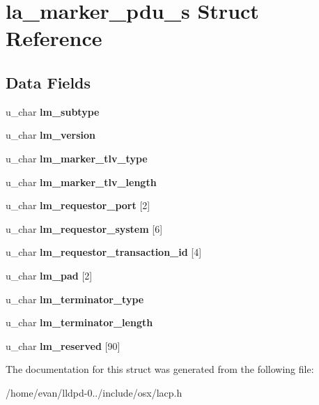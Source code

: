 \section{la\-\_\-marker\-\_\-pdu\-\_\-s \-Struct \-Reference}
\label{structla__marker__pdu__s}
\subsection*{\-Data \-Fields}
\begin{DoxyCompactItemize}
\item 
u\-\_\-char {\bfseries lm\-\_\-subtype}\label{structla__marker__pdu__s_aa5a9c3a8edf37f5c0cc5b5baed18b2ce}

\item 
u\-\_\-char {\bfseries lm\-\_\-version}\label{structla__marker__pdu__s_ae888b016721821cbb34fe34c0d203d86}

\item 
u\-\_\-char {\bfseries lm\-\_\-marker\-\_\-tlv\-\_\-type}\label{structla__marker__pdu__s_af33c94f2590be4493f1e572c605beeb7}

\item 
u\-\_\-char {\bfseries lm\-\_\-marker\-\_\-tlv\-\_\-length}\label{structla__marker__pdu__s_ad3bf3f23d14d859f72741f315e442b17}

\item 
u\-\_\-char {\bfseries lm\-\_\-requestor\-\_\-port} [2]\label{structla__marker__pdu__s_adbef70055c70a5179dc0ee6394f75e5f}

\item 
u\-\_\-char {\bfseries lm\-\_\-requestor\-\_\-system} [6]\label{structla__marker__pdu__s_afcc98f1122bd6fdce54c5acac9652402}

\item 
u\-\_\-char {\bfseries lm\-\_\-requestor\-\_\-transaction\-\_\-id} [4]\label{structla__marker__pdu__s_a30538d098282488e418de70c0ff499c5}

\item 
u\-\_\-char {\bfseries lm\-\_\-pad} [2]\label{structla__marker__pdu__s_a84c505df5e8a60709a34643fa53ce9fe}

\item 
u\-\_\-char {\bfseries lm\-\_\-terminator\-\_\-type}\label{structla__marker__pdu__s_a68be75756c8b4845e5ac0cbffe408951}

\item 
u\-\_\-char {\bfseries lm\-\_\-terminator\-\_\-length}\label{structla__marker__pdu__s_a8a1b58f657169d86a039a8131635040b}

\item 
u\-\_\-char {\bfseries lm\-\_\-reserved} [90]\label{structla__marker__pdu__s_a7accdb47fcff6d86045a4e0bf887935f}

\end{DoxyCompactItemize}


\-The documentation for this struct was generated from the following file\-:\begin{DoxyCompactItemize}
\item 
/home/evan/lldpd-\/0../include/osx/lacp.\-h\end{DoxyCompactItemize}
